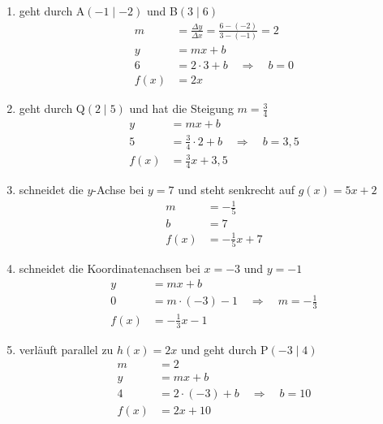 \documentclass[a4paper,ngerman,12pt]{exam}
\begin{document}
\begin{questions}
  \begin{solution}
    \begin{enumerate}[label=\alph*)]
      \item geht durch A$(-1\mid-2)$ und B$(3\mid6)$
            \begin{align*}
              m    & =\frac{\Delta y}{\Delta x}=\frac{6-(-2)}{3-(-1)}=2 \\[0.3cm]
              y    & =mx+b                                              \\
              6    & =2\cdot 3+b\quad\Rightarrow\quad b=0               \\[0.3cm]
              f(x) & =2x
            \end{align*}
      \item geht durch Q$(2\mid5)$ und hat die Steigung $m=\frac{3}{4}$
            \begin{align*}
              y    & =mx+b                                              \\
              5    & =\frac{3}{4}\cdot 2+b\quad\Rightarrow\quad b=3{,}5 \\[0.3cm]
              f(x) & =\frac{3}{4}x+3{,}5
            \end{align*}
      \item schneidet die $y$-Achse bei $y=7$ und steht senkrecht auf $g(x)=5x+2$
            \begin{align*}
              m    & =-\frac{1}{5}    \\[0.3cm]
              b    & =7               \\[0.5cm]
              f(x) & =-\frac{1}{5}x+7
            \end{align*}
      \item schneidet die Koordinatenachsen bei $x=-3$ und $y=-1$
            \begin{align*}
              y    & =mx+b                                             \\
              0    & =m\cdot(-3)-1\quad\Rightarrow\quad m=-\frac{1}{3} \\[0.3cm]
              f(x) & =-\frac{1}{3}x-1
            \end{align*}

      \item verläuft parallel zu $h(x)=2x$ und geht durch P$(-3\mid4)$
            \begin{align*}
              m    & =2                                       \\[0.3cm]
              y    & =mx+b                                    \\
              4    & =2\cdot (-3)+b\quad\Rightarrow\quad b=10 \\[0.3cm]
              f(x) & =2x+10
            \end{align*}


\end{enumerate}
\end{solution}
\end{questions}
\end{document}
